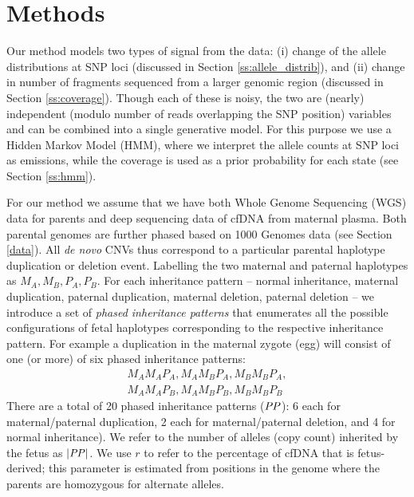 \section{Methods}
Our method models two types of signal from the data: (i) change of the allele distributions at SNP loci (discussed in Section \ref{ss:allele_distrib}), and (ii) change in number of fragments sequenced from a larger genomic region (discussed in Section \ref{ss:coverage}). Though each of these is noisy, the two are (nearly) independent (modulo number of reads overlapping the SNP position) variables and can be combined into a single generative model. For this purpose we use a Hidden Markov Model (HMM), where we interpret the allele counts at SNP loci as emissions, while the coverage is used as a prior probability for each state (see Section \ref{ss:hmm}). 

For our method we assume that we have both Whole Genome Sequencing (WGS) data for parents and deep sequencing data of cfDNA from maternal plasma. Both parental genomes are further phased based on 1000 Genomes data (see Section \ref{data}). All \textit{de novo} CNVs thus correspond to a particular parental haplotype duplication or deletion event. Labelling the two maternal and paternal haplotypes as $M_A,M_B,P_A,P_B$. For each inheritance pattern -- normal inheritance, maternal duplication, paternal duplication, maternal deletion, paternal deletion -- we introduce a set of \textit{phased inheritance patterns} that enumerates all the possible configurations of fetal haplotypes corresponding to the respective inheritance pattern. For example a duplication in the maternal zygote (egg) will consist of one (or more) 
of  six phased inheritance patterns:
\begin{align*}
M_AM_AP_A, M_AM_BP_A, M_BM_BP_A,\\
M_AM_AP_B, M_AM_BP_B, M_BM_BP_B
\end{align*}
There are a total of 20 phased inheritance patterns ($\mathit{PP}$): 6 each for maternal/paternal duplication, 2 each for maternal/paternal deletion, and 4 for normal inheritance). We refer to the number of alleles (copy count) inherited by the fetus as $|\mathit{PP}|$. We use $r$ to refer to the percentage of cfDNA that is fetus-derived; this parameter is estimated from positions in the genome where the parents are homozygous for alternate alleles.


